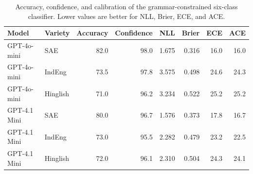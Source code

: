 \begin{table}[t]
\centering
\caption{Accuracy, confidence, and calibration of the grammar-constrained six-class classifier. Lower values are better for NLL, Brier, ECE, and ACE.}
\label{tab:calibration-main}
\small
\begin{tabular}{llrrrrrr}
\toprule
Model & Variety & Accuracy & Confidence & NLL & Brier & ECE & ACE \\
\midrule
GPT-4o-mini & SAE & 82.0 & 98.0 & 1.675 & 0.316 & 16.0 & 16.0 \\
GPT-4o-mini & IndEng & 73.5 & 97.8 & 3.575 & 0.498 & 24.6 & 24.3 \\
GPT-4o-mini & Hinglish & 71.0 & 96.2 & 3.234 & 0.522 & 25.2 & 25.2 \\
\addlinespace
GPT-4.1 Mini & SAE & 80.0 & 96.7 & 1.576 & 0.373 & 17.8 & 16.7 \\
GPT-4.1 Mini & IndEng & 73.0 & 95.5 & 2.282 & 0.479 & 23.2 & 22.5 \\
GPT-4.1 Mini & Hinglish & 72.0 & 96.1 & 2.310 & 0.504 & 24.3 & 24.1 \\
\bottomrule
\end{tabular}
\end{table}
